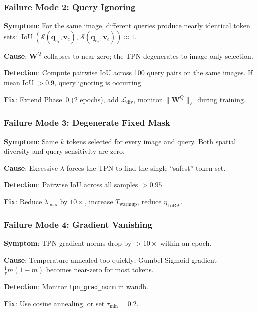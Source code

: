 \documentclass[11pt,a4paper]{article}
\DeclareMathOperator{\IoU}{IoU}
\newcommand{\vc}{\mathbf{v}_c}
\newcommand{\qe}{\mathbf{q}_e}
\begin{document}
\subsubsection{Failure Mode 2: Query Ignoring}

\begin{warnbox}[title={Query Ignoring}]
\textbf{Symptom}: For the same image, different queries produce nearly
identical token sets:
$\IoU(\mathcal{S}(\qe_1, \vc),\, \mathcal{S}(\qe_2, \vc)) \approx 1$.

\textbf{Cause}: $\mathbf{W}^Q$ collapses to near-zero; the TPN degenerates
to image-only selection.

\textbf{Detection}: Compute pairwise IoU across 100 query pairs on the same
images. If mean IoU $> 0.9$, query ignoring is occurring.

\textbf{Fix}: Extend Phase~0 (2 epochs), add $\mathcal{L}_{\text{div}}$,
monitor $\|\mathbf{W}^Q\|_F$ during training.
\end{warnbox}

\subsubsection{Failure Mode 3: Degenerate Fixed Mask}

\begin{warnbox}[title={Degenerate Fixed Mask}]
\textbf{Symptom}: Same $k$ tokens selected for every image and query.
Both spatial diversity and query sensitivity are zero.

\textbf{Cause}: Excessive $\lambda$ forces the TPN to find the single
``safest'' token set.

\textbf{Detection}: Pairwise IoU across all samples $> 0.95$.

\textbf{Fix}: Reduce $\lambda_{\max}$ by $10\times$, increase
$T_{\text{warmup}}$, reduce $\eta_{\text{LoRA}}$.
\end{warnbox}

\subsubsection{Failure Mode 4: Gradient Vanishing}

\begin{warnbox}[title={Gradient Vanishing Through STE}]
\textbf{Symptom}: TPN gradient norms drop by $>10\times$ within an epoch.

\textbf{Cause}: Temperature annealed too quickly; Gumbel-Sigmoid gradient
$\frac{1}{\tau}\tilde{m}(1{-}\tilde{m})$ becomes near-zero for most tokens.

\textbf{Detection}: Monitor \texttt{tpn\_grad\_norm} in wandb.

\textbf{Fix}: Use cosine annealing, or set $\tau_{\min} = 0.2$.
\end{warnbox}
\end{document}
